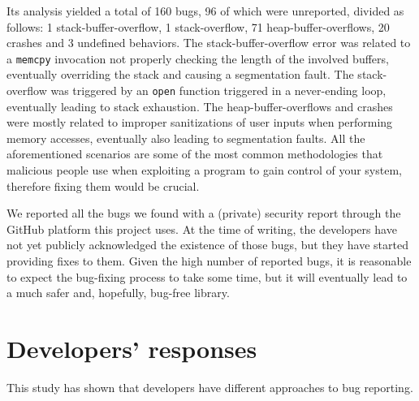 Its analysis yielded a total of 160 bugs, 96 of which were unreported, divided as follows: 1 stack-buffer-overflow, 1 stack-overflow, 71 heap-buffer-overflows, 20 crashes and 3 undefined behaviors. The stack-buffer-overflow error was related to a \verb|memcpy| invocation not properly checking the length of the involved buffers, eventually overriding the stack and causing a segmentation fault. The stack-overflow was triggered by an \verb|open| function triggered in a never-ending loop, eventually leading to stack exhaustion. The heap-buffer-overflows and crashes were mostly related to improper sanitizations of user inputs when performing memory accesses, eventually also leading to segmentation faults. All the aforementioned scenarios are some of the most common methodologies that malicious people use when exploiting a program to gain control of your system, therefore fixing them would be crucial.

We reported all the bugs we found with a (private) security report through the GitHub platform this project uses. At the time of writing, the developers have not yet publicly acknowledged the existence of those bugs, but they have started providing fixes to them. Given the high number of reported bugs, it is reasonable to expect the bug-fixing process to take some time, but it will eventually lead to a much safer and, hopefully, bug-free library. 








\newpage
\section{Developers' responses}
This study has shown that developers have different approaches to bug reporting. 

